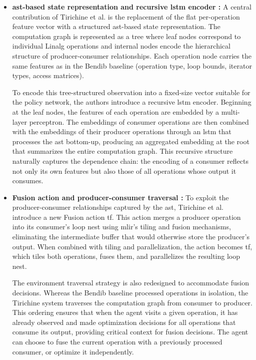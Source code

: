 \begin{itemize}
\item \textbf{\gls{ast}-based state representation and recursive \gls{lstm} encoder :} A central contribution of Tirichine et al. is the replacement of the flat per-operation feature vector with a structured \gls{ast}-based state representation. The computation graph is represented as a tree where leaf nodes correspond to individual Linalg operations and internal nodes encode the hierarchical structure of producer-consumer relationships. Each operation node carries the same features as in the Bendib baseline (operation type, loop bounds, iterator types, access matrices).

To encode this tree-structured observation into a fixed-size vector suitable for the policy network, the authors introduce a recursive \gls{lstm} encoder. Beginning at the leaf nodes, the features of each operation are embedded by a multi-layer perceptron. The embeddings of consumer operations are then combined with the embeddings of their producer operations through an \gls{lstm} that processes the \gls{ast} bottom-up, producing an aggregated embedding at the root that summarizes the entire computation graph. This recursive structure naturally captures the dependence chain: the encoding of a consumer reflects not only its own features but also those of all operations whose output it consumes.

\item \textbf{Fusion action and producer-consumer traversal :} To exploit the producer-consumer relationships captured by the \gls{ast}, Tirichine et al. introduce a new Fusion action \gls{tf}. This action merges a producer operation into its consumer's loop nest using \gls{mlir}'s tiling and fusion mechanisms, eliminating the intermediate buffer that would otherwise store the producer's output. When combined with tiling and parallelization, the action becomes \gls{tf}, which tiles both operations, fuses them, and parallelizes the resulting loop nest.

The environment traversal strategy is also redesigned to accommodate fusion decisions. Whereas the Bendib baseline processed operations in isolation, the Tirichine system traverses the computation graph from consumer to producer. This ordering ensures that when the agent visits a given operation, it has already observed and made optimization decisions for all operations that consume its output, providing critical context for fusion decisions. The agent can choose to fuse the current operation with a previously processed consumer, or optimize it independently.


\end{itemize}
